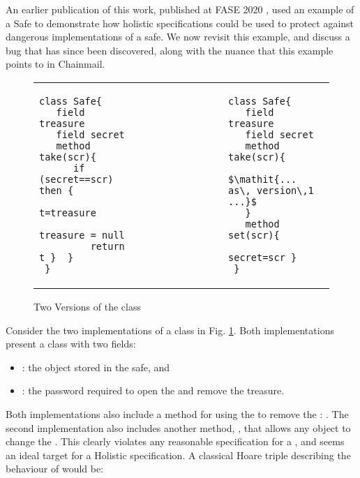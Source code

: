 An earlier publication of this work, published at FASE 2020 \cite{FASE}, used an example of a Safe to
demonstrate how holistic specifications could be used to protect against dangerous implementations
of a safe. We now revisit this example, and discuss a bug that has since been discovered, along with
the nuance that this example points to in Chainmail. 

 \begin{figure}[htb]
 \begin{tabular}{lll} %
\begin{minipage}{0.45\textwidth}
\begin{lstlisting}
class Safe{
   field treasure 
   field secret 
   method take(scr){
      if (secret==scr) then {
         t=treasure
         treasure = null
         return t }  }
 }
\end{lstlisting}
\end{minipage}
  &\ \ \  \ \ \ \ \  \ \ \ \ \ \ &
\begin{minipage}{0.45\textwidth}
\begin{lstlisting}
class Safe{
   field treasure   
   field secret  
   method take(scr){
       $\mathit{... as\, version\,1 ...}$ 
   }
   method set(scr){
         secret=scr }
 }
\end{lstlisting}
\end{minipage} 
 \end{tabular}
  \vspace*{-0.95cm}
  \caption{Two Versions of the class }
 \label{fig:ExampleSafe}
 \vspace*{-0.65cm}
 \end{figure}

Consider the two implementations of a  class in Fig. \ref{fig:ExampleSafe}. Both implementations 
present a class with two fields:
\begin{itemize}
\item
{} : the object stored in the safe,  and 
\item
{} : the password required to open the  and remove the treasure.
\end{itemize}
Both implementations also include a method for using the 
  to remove the : .
The second implementation also includes another method, , that allows any object to change the .
This clearly violates any reasonable specification for a , and seems an ideal target for a Holistic specification.
 A classical Hoare triple describing the behaviour of  would be:
 
